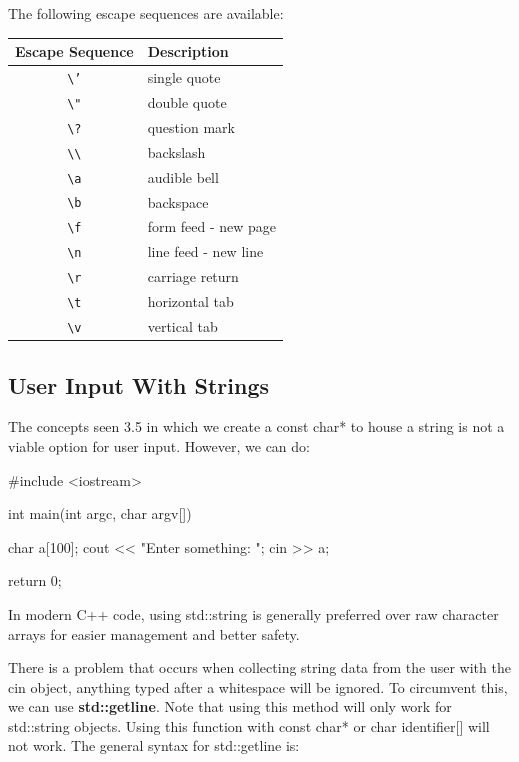 \documentclass{report}
\begin{document}
    The following escape sequences are available:
    \begin{center}
    \begin{tabular}{|c|l|}
        \hline
        \textbf{Escape Sequence} & \textbf{Description} \\
        \hline
        \texttt{\textbackslash'} & single quote \\
        \texttt{\textbackslash"} & double quote \\
        \texttt{\textbackslash?} & question mark \\
        \texttt{\textbackslash\textbackslash} & backslash \\
        \texttt{\textbackslash a} & audible bell \\
        \texttt{\textbackslash b} & backspace \\
        \texttt{\textbackslash f} & form feed - new page \\
        \texttt{\textbackslash n} & line feed - new line \\
        \texttt{\textbackslash r} & carriage return \\
        \texttt{\textbackslash t} & horizontal tab \\
        \texttt{\textbackslash v} & vertical tab \\
        \hline
        \end{tabular}
    \end{center}


    \pagebreak \bigbreak \noindent 
    \subsection{User Input With Strings}
    \bigbreak \noindent 
    \begin{remark}
        The concepts seen 3.5 in which we create a const char* to house a string is not a viable option for user input. However, we can do:
    \end{remark}

        \bigbreak \noindent 
        
        \begin{cppcode}
#include <iostream>

int main(int argc, char argv[]){

    char a[100];
    cout << "Enter something: ";
    cin >> a;

    return 0;
}
        \end{cppcode}
        
    \bigbreak \noindent 
    \begin{notebox}
			In modern C++ code, using std::string is generally preferred over raw character arrays for easier management and better safety.
		\end{notebox}
    \bigbreak \noindent 
    There is a problem that occurs when collecting string data from the user with the cin object, anything typed after a whitespace will be ignored. To circumvent this, we can use \textbf{std::getline}. Note that using this method will only work for std::string objects. Using this function with const char* or char identifier[] will not work.
    \bigbreak \noindent 
    The general syntax for std::getline is:
    \smallbreak \noindent
    
\end{document}
